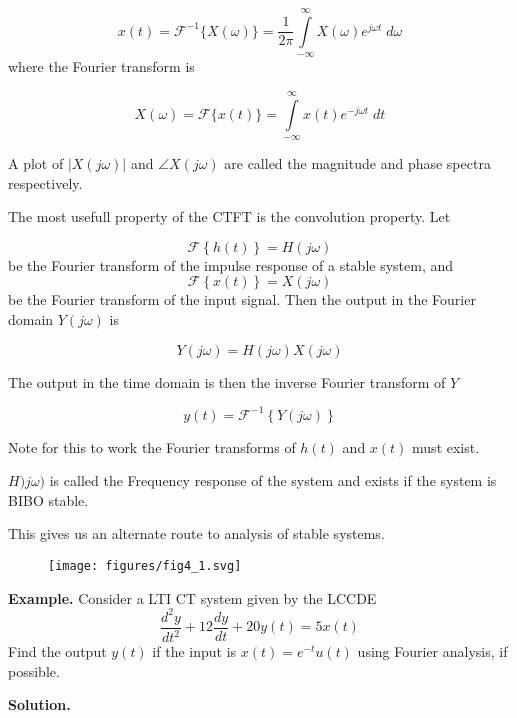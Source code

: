 \documentclass{article}
\begin{document}
\[
x(t) = \mathcal{F}^{-1}\{X(\omega)\} = \frac{1}{2\pi} \int\limits_{-\infty}^{\infty} X(\omega)e^{j\omega t}\; d\omega
\]
where the Fourier transform is

\[
X(\omega) = \mathcal{F}\{x(t)\} = \int\limits_{-\infty}^{\infty} x(t) e^{-j\omega t}\; dt
\]

A plot of $|X(j\omega)|$ and $\angle X(j\omega)$ are called the magnitude and phase spectra respectively.

The most usefull property of the CTFT is the convolution property. Let

\[
\mathcal{F}\left\{ h(t) \right\} = H(j\omega)
\]
be the Fourier transform of the impulse response of a stable system, and
\[
\mathcal{F}\left\{ x(t) \right\} = X(j\omega)
\]
be the Fourier transform of the input signal. Then the output in the Fourier domain $Y(j\omega)$ is

\[
Y(j\omega) = H(j\omega)X(j\omega)
\]

The output in the time domain is then the inverse Fourier transform of $Y$

\[
y(t) = \mathcal{F}^{-1}\left\{ Y(j\omega) \right\}
\]

Note for this to work the Fourier transforms of $h(t)$ and $x(t)$ must exist.

$H)j\omega)$ is called the Frequency response of the system and exists if the system is BIBO stable.

This gives us an alternate route to analysis of stable systems.

\begin{figure}
  \centering
  \texttt{[image: figures/fig4\_1.svg]}
\end{figure}

\textbf{Example.} Consider a LTI CT system given by the LCCDE
\[
\frac{d^2y}{dt^2} + 12\frac{dy}{dt} + 20y(t) = 5x(t)
\]
Find the output $y(t)$ if the input is $x(t) = e^{-t}u(t)$ using Fourier analysis, if possible.

\textbf{Solution.}
\end{document}
